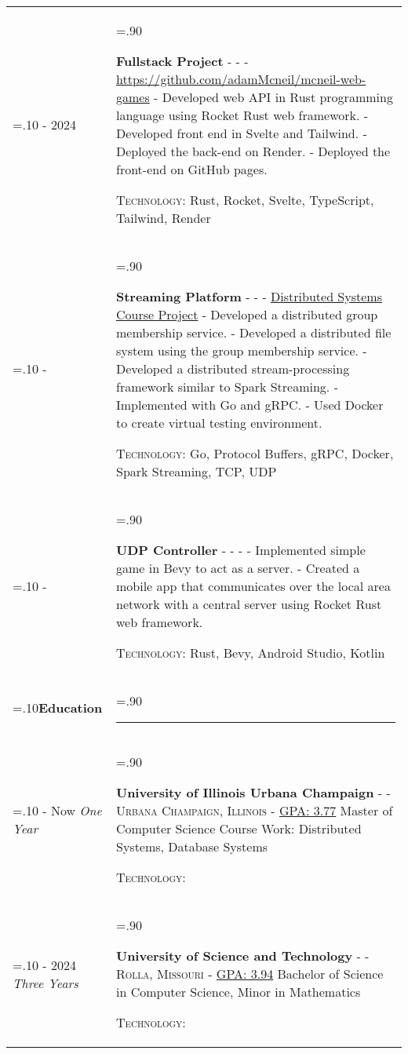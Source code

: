 \documentclass[10pt]{article}
\newcommand{\timeFrame}[3] {
  \if\relax\detokenize{#2}\relax
    #1
  \else
    #1 - #2
  \fi
  \newline
  \scriptsize \textit{#3}
}
\newcommand{\entry}[6] {
  \textbf{#1}
  \if\relax\detokenize{#2}\relax
  \else
       - \textsc{#2}
  \fi
  \if\relax\detokenize{#3}\relax
  \else
      - \textsc{#3}
  \fi
  \if\relax\detokenize{#4}\relax
  \else
      - \href{https://#4}{#4}
  \fi
  \newline #5
  \if\relax\detokenize{#6}\relax
  \else
      \newline \textsc{Technology:} #6
  \fi
  \\
}
\newcommand{\horizontalLine}[0] {
    \noindent\rule{.90\linewidth}{0.4pt}
}
\begin{document}
\begin{tabularx}{\linewidth}{>{\hsize=.10\hsize}X>{\hsize=.90\hsize}X}
\timeFrame{2023}{2024}{} &
\entry{Fullstack Project}
  {}
  {}
  {https://github.com/adamMcneil/mcneil-web-games}
  {
  - Developed web API in Rust programming language using Rocket Rust web framework. \newline
  - Developed front end in Svelte and Tailwind. \newline
  - Deployed the back-end on Render. \newline
  - Deployed the front-end on GitHub pages.
  }
  {Rust, Rocket, Svelte, TypeScript, Tailwind, Render \newline}


\timeFrame{2024}{}{} &
\entry{Streaming Platform}
  {}
  {}
  {Distributed Systems Course Project}
  {
  - Developed a distributed group membership service. \newline
  - Developed a distributed file system using the group membership service. \newline
  - Developed a distributed stream-processing framework similar to Spark Streaming. \newline
  - Implemented with Go and gRPC. \newline
  - Used Docker to create virtual testing environment.
  }
  {Go, Protocol Buffers, gRPC, Docker, Spark Streaming, TCP, UDP\newline}


\timeFrame{2024}{}{} &
\entry{UDP Controller}
  {}
  {}
  {}
  {
    - Implemented simple game in Bevy to act as a server. \newline
    - Created a mobile app that communicates over the local area network with a central server using Rocket Rust web framework.
  }
  {Rust, Bevy, Android Studio, Kotlin}

\textbf{Education} & \horizontalLine \\

\timeFrame{2024}{Now}{One Year} &
\entry{University of Illinois Urbana Champaign}
  {}
  {Urbana Champaign, Illinois}
  {GPA: 3.77}
  {
  Master of Computer Science \newline
      Course Work: Distributed Systems, Database Systems 
  }
  {}

\timeFrame{2021}{2024}{Three Years} &
\entry{University of Science and Technology}
  {}
  {Rolla, Missouri}
  {GPA: 3.94}
  {
  Bachelor of Science in Computer Science, Minor in Mathematics
  }
  {}

\end{tabularx}
\end{document}
